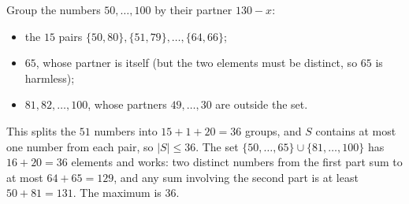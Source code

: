 Group the numbers $50,\dots,100$ by their partner $130-x$:
\begin{itemize}
\item the $15$ pairs $\{50,80\},\{51,79\},\dots,\{64,66\}$;
\item $65$, whose partner is itself (but the two elements must be distinct, so $65$ is harmless);
\item $81,82,\dots,100$, whose partners $49,\dots,30$ are outside the set.
\end{itemize}
This splits the $51$ numbers into $15+1+20=36$ groups, and $S$ contains at most one number from each pair, so $|S|\le36$. The set $\{50,\dots,65\}\cup\{81,\dots,100\}$ has $16+20=36$ elements and works: two distinct numbers from the first part sum to at most $64+65=129$, and any sum involving the second part is at least $50+81=131$. The maximum is $\boxed{36}$.
